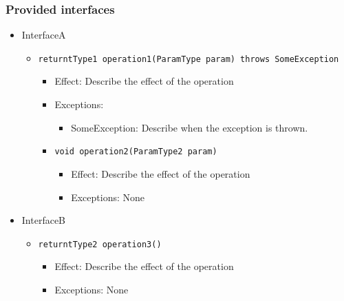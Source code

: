 \subsubsection*{Provided interfaces}
\begin{itemize}
    \item InterfaceA
    \begin{itemize}
        \item \texttt{returntType1 operation1(ParamType param) throws SomeException}
        \begin{itemize}
            \item Effect: Describe the effect of the operation
            \item Exceptions:
            \begin{itemize}
                \item SomeException: Describe when the exception is thrown.
            \end{itemize}

            \item \texttt{void operation2(ParamType2 param)}
            \begin{itemize}
                \item Effect: Describe the effect of the operation
                \item Exceptions: None
            \end{itemize}
        \end{itemize}
    \end{itemize}

    \item InterfaceB
    \begin{itemize}
        \item \texttt{returntType2 operation3()}
        \begin{itemize}
            \item Effect: Describe the effect of the operation
            \item Exceptions: None
        \end{itemize}
    \end{itemize}
\end{itemize}